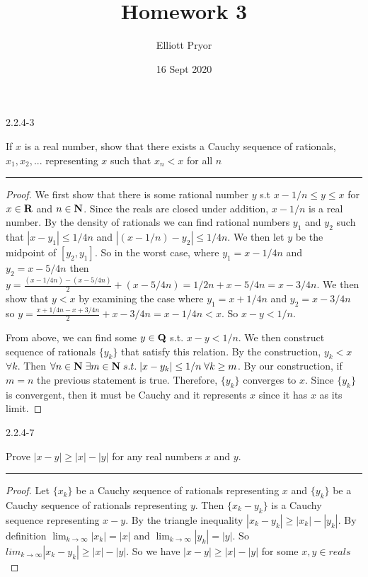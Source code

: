 \documentclass[11pt]{article}
\title{Homework 3}
\author{Elliott Pryor}
\date{16 Sept 2020}
\begin{document}
\maketitle



 2.2.4-3

If $x$ is a real number, show that there exists a Cauchy sequence of rationals, $x_1, x_2, ...$ representing $x$ such that $x_n < x$ for all $n$
\hrule

\begin{proof}


We first show that there is some rational number $y$ s.t $x-1/n \leq y \leq x$ for $x \in \mathbf{R}$ and $n \in \mathbf{N}$. Since the reals are closed under addition, $x - 1/n$ is a real number. By the density of rationals we can find rational numbers $y_1$ and $y_2$ such that $|x - y_1| \leq 1/4n$ and $|(x-1/n) - y_2| \leq 1/4n$. We then let $y$ be the midpoint of $[y_2, y_1]$.  So in the worst case, where $y_1 = x - 1/4n$ and $y_2 = x - 5/4n$ then $y = \frac{(x - 1/4n) - (x - 5/4n)}{2} + (x - 5/4n) = 1/2n + x - 5/4n = x - 3/4n$. 
We then show that $y < x$ by examining the case where $y_1 = x + 1/4n$ and $y_2 = x - 3/4n$ so $y = \frac{x + 1/4n - x + 3/4n}{2} +  x - 3/4n = x - 1/4n < x$.
So $x - y < 1/n$.

From above, we can find some $y \in \mathbf{Q}$ s.t. $x - y < 1/n$. We then construct sequence of rationals $\{y_k\}$ that satisfy this relation. By the construction, $y_k < x$ $\forall k$. Then $\forall n \in \mathbf{N} \; \exists m \in \mathbf{N} \; s.t. \; |x - y_k| \leq 1/n \; \forall k \geq m$. By our construction, if $m = n$ the previous statement is true. Therefore, $\{y_k\}$ converges to $x$. Since $\{y_k\}$ is convergent, then it must be Cauchy and it represents $x$ since it has $x$ as its limit.
\end{proof}



 2.2.4-7

Prove $|x-y| \geq |x| - |y|$ for any real numbers $x$ and $y$.
\hrule


\begin{proof}

Let $\{x_k\}$ be a Cauchy sequence of rationals representing $x$ and $\{y_k\}$ be a Cauchy sequence of rationals representing $y$. Then $\{x_k - y_k\}$ is a Cauchy sequence representing $x - y$. By the triangle inequality $|x_k - y_k| \geq |x_k| - |y_k|$. By definition $\lim_{k \to \infty} |x_k| = |x|$ and $\lim_{k \to \infty} |y_k| = |y|$. So $lim_{k \to \infty} |x_k - y_k| \geq |x| - |y|$. So we have $|x - y| \geq |x| - |y|$ for some $x,y \in reals$

\end{proof}
\end{document}
